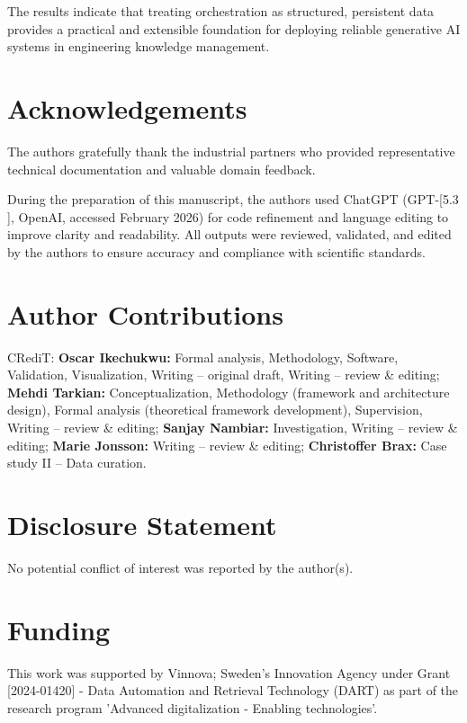 \documentclass[largeformat]{interact}
\begin{document}
The results indicate that treating orchestration as structured, persistent data provides a practical and extensible foundation for deploying reliable generative AI systems in engineering knowledge management.


\section*{Acknowledgements}
The authors gratefully thank the industrial partners who provided representative technical documentation and valuable domain feedback.

\noindent During the preparation of this manuscript, the authors used ChatGPT (GPT-[5.3 ], OpenAI, accessed February 2026) for code refinement and language editing to improve clarity and readability. All outputs were reviewed, validated, and edited by the authors to ensure accuracy and compliance with scientific standards.
\section*{Author Contributions}
CRediT: \textbf{Oscar Ikechukwu:} Formal analysis, Methodology, Software, Validation, Visualization, Writing -- original draft, Writing -- review \& editing; \textbf{Mehdi Tarkian:} Conceptualization, Methodology (framework and architecture design), Formal analysis (theoretical framework development), Supervision, Writing -- review \& editing; \textbf{Sanjay Nambiar:} Investigation, Writing -- review \& editing; \textbf{Marie Jonsson:} Writing -- review \& editing; \textbf{Christoffer Brax:} Case study II -- Data curation.

\section*{Disclosure Statement}
No potential conflict of interest was reported by the author(s).
\section*{Funding}
\noindent This work was supported by Vinnova; Sweden's Innovation Agency under Grant [2024-01420] - Data Automation and Retrieval Technology (DART) as part of the research program 'Advanced digitalization - Enabling technologies'.
\end{document}
